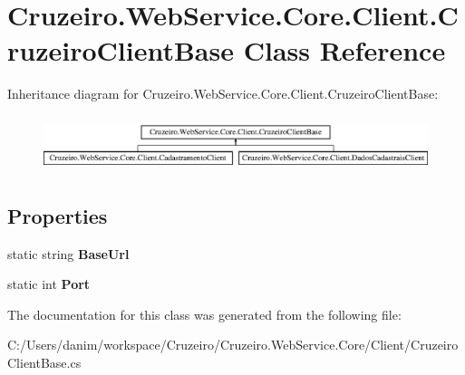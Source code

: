 \section{Cruzeiro.\+Web\+Service.\+Core.\+Client.\+Cruzeiro\+Client\+Base Class Reference}
\label{class_cruzeiro_1_1_web_service_1_1_core_1_1_client_1_1_cruzeiro_client_base}
Inheritance diagram for Cruzeiro.\+Web\+Service.\+Core.\+Client.\+Cruzeiro\+Client\+Base\+:\begin{figure}[H]
\begin{center}
\leavevmode
\includegraphics[height=1.637427cm]{class_cruzeiro_1_1_web_service_1_1_core_1_1_client_1_1_cruzeiro_client_base}
\end{center}
\end{figure}
\subsection*{Properties}
\begin{DoxyCompactItemize}
\item 
static string {\bfseries Base\+Url}\hspace{0.3cm}{\ttfamily  [get, set]}\label{class_cruzeiro_1_1_web_service_1_1_core_1_1_client_1_1_cruzeiro_client_base_a7c6f5e903c740edb7db12dc461bfe91f}

\item 
static int {\bfseries Port}\hspace{0.3cm}{\ttfamily  [get, set]}\label{class_cruzeiro_1_1_web_service_1_1_core_1_1_client_1_1_cruzeiro_client_base_aa376555a81f37a570e5dd0454c410628}

\end{DoxyCompactItemize}


The documentation for this class was generated from the following file\+:\begin{DoxyCompactItemize}
\item 
C\+:/\+Users/danim/workspace/\+Cruzeiro/\+Cruzeiro.\+Web\+Service.\+Core/\+Client/Cruzeiro\+Client\+Base.\+cs\end{DoxyCompactItemize}
